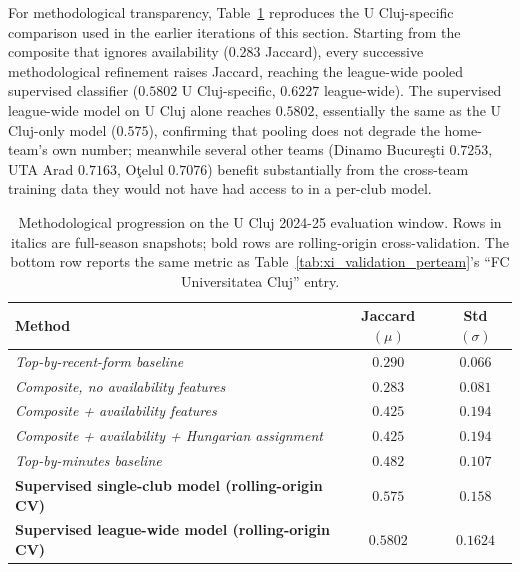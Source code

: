 For methodological transparency, Table~\ref{tab:xi_validation_ablation} reproduces the U Cluj-specific comparison used in the earlier iterations of this section. Starting from the composite that ignores availability ($0.283$ Jaccard), every successive methodological refinement raises Jaccard, reaching the league-wide pooled supervised classifier ($0.5802$ U Cluj-specific, $0.6227$ league-wide). The supervised league-wide model on U Cluj alone reaches $0.5802$, essentially the same as the U Cluj-only model ($0.575$), confirming that pooling does not degrade the home-team's own number; meanwhile several other teams (Dinamo Bucureşti $0.7253$, UTA Arad $0.7163$, Oţelul $0.7076$) benefit substantially from the cross-team training data they would not have had access to in a per-club model.

\begin{table}[htbp]
\centering
\caption{Methodological progression on the U Cluj 2024-25 evaluation window. Rows in italics are full-season snapshots; bold rows are rolling-origin cross-validation. The bottom row reports the same metric as Table~\ref{tab:xi_validation_perteam}'s ``FC Universitatea Cluj'' entry.}
\label{tab:xi_validation_ablation}
\begin{tabular}{|l|c|c|}
\hline
\textbf{Method} & \textbf{Jaccard $(\mu)$} & \textbf{Std $(\sigma)$} \\
\hline
\textit{Top-by-recent-form baseline}                            & $0.290$ & $0.066$ \\
\hline
\textit{Composite, no availability features}                   & $0.283$ & $0.081$ \\
\hline
\textit{Composite + availability features}                     & $0.425$ & $0.194$ \\
\hline
\textit{Composite + availability + Hungarian assignment}       & $0.425$ & $0.194$ \\
\hline
\textit{Top-by-minutes baseline}                                & $0.482$ & $0.107$ \\
\hline
\textbf{Supervised single-club model (rolling-origin CV)}      & $0.575$ & $0.158$ \\
\hline
\textbf{Supervised league-wide model (rolling-origin CV)}      & $\mathbf{0.5802}$ & $\mathbf{0.1624}$ \\
\hline
\end{tabular}
\end{table}

